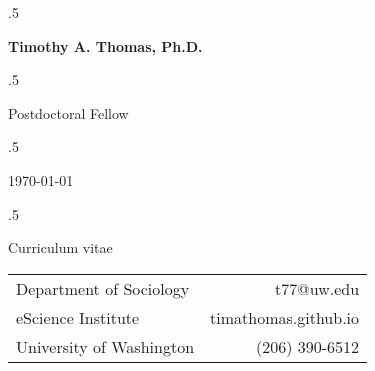 \documentclass{resume} %
\begin{document}
\moveleft.5\hoffset\centerline{\LARGE\bf Timothy A. Thomas, Ph.D.} %
\vspace{5mm}
\moveleft.5\hoffset\centerline{Postdoctoral Fellow} %
\moveleft.5\hoffset\centerline{\today} %
\moveleft.5\hoffset\centerline{Curriculum vitae} %

\begin{center}
\begin{tabular}{l r}
Department of Sociology 	& \hspace{3in} t77@uw.edu \\
eScience Institute	    	& \hspace{3in} timathomas.github.io\\
University of Washington   	& \hspace{3in} (206) 390-6512
\end{tabular}
\vspace{5mm}
\end{center}

\end{document}
